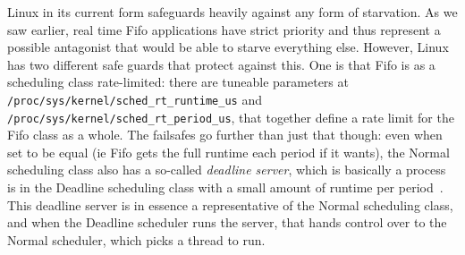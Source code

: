 Linux in its current form safeguards heavily against any form of starvation. As
we saw earlier, real time Fifo applications have strict priority and thus
represent a possible antagonist that would be able to starve everything else.
However, Linux has two different safe guards that protect against this. One is
that Fifo is as a scheduling class rate-limited: there are tuneable parameters
at \texttt{/proc/sys/kernel/sched\_rt\_runtime\_us} and
\texttt{/proc/sys/kernel/sched\_rt\_period\_us}, that together define a rate
limit for the Fifo class as a whole. The failsafes go further than just that
though: even when set to be equal (ie Fifo gets the full runtime each period if
it wants), the Normal scheduling class also has a so-called \textit{deadline
server}, which is basically a process is in the Deadline scheduling class with a
small amount of runtime per period~\cite{lkml-deadline-srv}. This deadline
server is in essence a representative of the Normal scheduling class, and when
the Deadline scheduler runs the server, that hands control over to the Normal
scheduler, which picks a thread to run.


